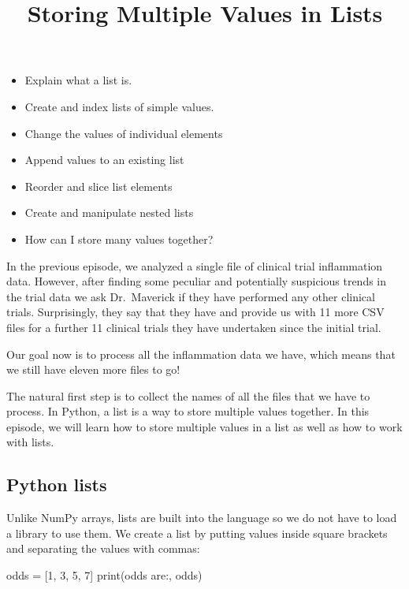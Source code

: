 \documentclass[
  letterpaper,
  DIV=11,
  numbers=noendperiod]{scrartcl}
\title{Storing Multiple Values in Lists}
\author{}
\date{}
\newenvironment{Shaded}{\begin{snugshade}}{\end{snugshade}}
\newcommand{\BuiltInTok}[1]{\textcolor[rgb]{0.00,0.23,0.31}{#1}}
\newcommand{\DecValTok}[1]{\textcolor[rgb]{0.68,0.00,0.00}{#1}}
\newcommand{\NormalTok}[1]{\textcolor[rgb]{0.00,0.23,0.31}{#1}}
\newcommand{\OperatorTok}[1]{\textcolor[rgb]{0.37,0.37,0.37}{#1}}
\newcommand{\StringTok}[1]{\textcolor[rgb]{0.13,0.47,0.30}{#1}}
\providecommand{\tightlist}{%
  \setlength{\itemsep}{0pt}\setlength{\parskip}{0pt}}
\theoremstyle{remark}
\begin{document}
\maketitle


\begin{itemize}
\tightlist
\item
  Explain what a list is.
\item
  Create and index lists of simple values.
\item
  Change the values of individual elements
\item
  Append values to an existing list
\item
  Reorder and slice list elements
\item
  Create and manipulate nested lists
\end{itemize}

\begin{itemize}
\tightlist
\item
  How can I store many values together?
\end{itemize}

In the previous episode, we analyzed a single file of clinical trial
inflammation data. However, after finding some peculiar and potentially
suspicious trends in the trial data we ask Dr.~Maverick if they have
performed any other clinical trials. Surprisingly, they say that they
have and provide us with 11 more CSV files for a further 11 clinical
trials they have undertaken since the initial trial.

Our goal now is to process all the inflammation data we have, which
means that we still have eleven more files to go!

The natural first step is to collect the names of all the files that we
have to process. In Python, a list is a way to store multiple values
together. In this episode, we will learn how to store multiple values in
a list as well as how to work with lists.

\subsection{Python lists}\label{python-lists}

Unlike NumPy arrays, lists are built into the language so we do not have
to load a library to use them. We create a list by putting values inside
square brackets and separating the values with commas:

\begin{Shaded}
\begin{Highlighting}[]
\NormalTok{odds }\OperatorTok{=}\NormalTok{ [}\DecValTok{1}\NormalTok{, }\DecValTok{3}\NormalTok{, }\DecValTok{5}\NormalTok{, }\DecValTok{7}\NormalTok{]}
\BuiltInTok{print}\NormalTok{(}\StringTok{\textquotesingle{}odds are:\textquotesingle{}}\NormalTok{, odds)}
\end{Highlighting}
\end{Shaded}
\end{document}
